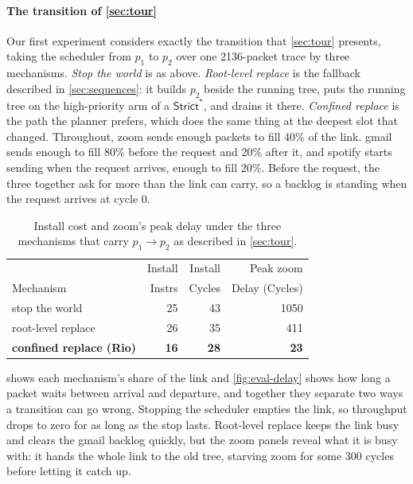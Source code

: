 \documentclass[sigplan,anonymous,review,nonacm]{acmart}
\newcommand{\Strictstar}{\textsf{Strict}^{*}}
\begin{document}
\paragraph{The transition of \cref{sec:tour}}

Our first experiment considers exactly the transition that \cref{sec:tour} presents, taking the scheduler from \(p_1\) to \(p_2\) over one 2136-packet trace by three mechanisms.
\emph{Stop the world} is as above.
\emph{Root-level replace} is the fallback described in \cref{sec:sequences}: it builds \(p_2\) beside the running tree, puts the running tree on the high-priority arm of a \(\Strictstar\), and drains it there.
\emph{Confined replace} is the path the planner prefers, which does the same thing at the deepest slot that changed.
Throughout, \textsf{zoom} sends enough packets to fill 40\% of the link.
\textsf{gmail} sends enough to fill 80\% before the request and 20\% after it, and \textsf{spotify} starts sending when the request arrives, enough to fill 20\%.
Before the request, the three together ask for more than the link can carry, so a backlog is standing when the request arrives at cycle 0.

\begin{table}[t]
\centering
\small
\begin{tabular}{lrrr}
\toprule
& Install & Install & Peak \textsf{zoom} \\
Mechanism & Instrs & Cycles & Delay (Cycles) \\
\midrule
stop the world & 25 & 43 & 1050 \\
root-level replace & 26 & 35 & 411 \\
\textbf{confined replace (Rio)} & \textbf{16} & \textbf{28} & \textbf{23} \\
\bottomrule
\end{tabular}
\caption{Install cost and \textsf{zoom}'s peak delay under the three mechanisms that carry \(p_1 \to p_2\) as described in \cref{sec:tour}.}
\label{tab:eval-motivating}
\end{table}

 shows each mechanism's share of the link and \cref{fig:eval-delay} shows how long a packet waits between arrival and departure, and together they separate two ways a transition can go wrong.
Stopping the scheduler empties the link, so throughput drops to zero for as long as the stop lasts.
Root-level replace keeps the link busy and clears the \textsf{gmail} backlog quickly, but the \textsf{zoom} panels reveal what it is busy with: it hands the whole link to the old tree, starving \textsf{zoom} for some 300 cycles before letting it catch up.
\end{document}
